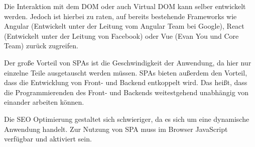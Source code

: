 Die Interaktion mit dem DOM oder auch Virtual DOM kann selber entwickelt werden. Jedoch ist hierbei zu raten, auf bereits bestehende Frameworks wie Angular (Entwickelt unter der Leitung vom Angular Team bei Google), React (Entwickelt unter der Leitung von Facebook) oder Vue (Evan You und Core Team) zurück zugreifen. 

Der große Vorteil von SPAs ist die Geschwindigkeit der Anwendung, da hier nur einzelne Teile ausgetauscht werden müssen. SPAs bieten außerdem den Vorteil, dass die Entwicklung von Front- und Backend entkoppelt wird. Das heißt, dass die Programmierenden des Front- und Backends weitestgehend unabhängig von einander arbeiten können.

Die SEO Optimierung gestaltet sich schwieriger, da es sich um eine dynamische Anwendung handelt.
Zur Nutzung von SPA muss im Browser JavaScript verfügbar und aktiviert sein.

